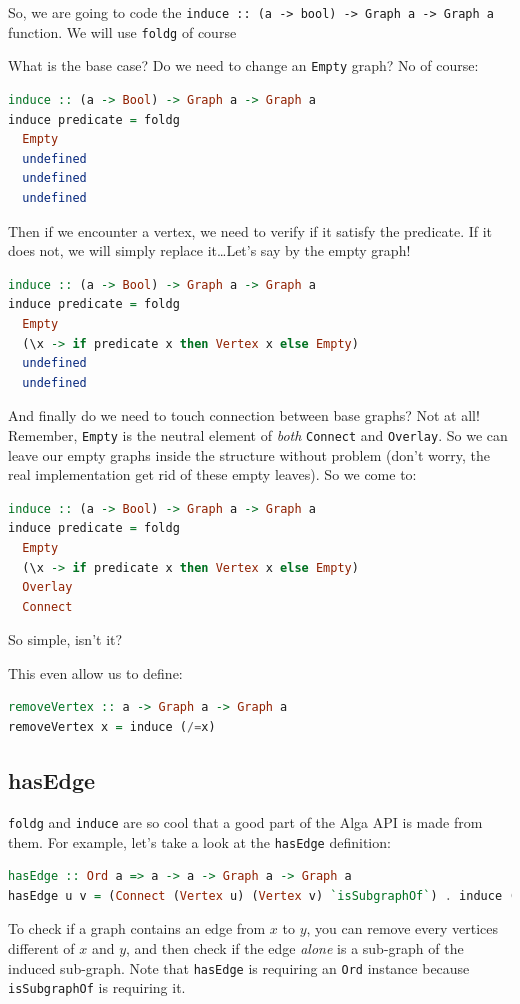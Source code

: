 \documentclass[10pt,a4paper]{article}
\begin{document}
So, we are going to code the \verb|induce :: (a -> bool) -> Graph a -> Graph a| function. We will use \verb|foldg| of course

What is the base case? Do we need to change an \verb|Empty| graph? No of course:

\begin{lstlisting}[language=Haskell, frame=single]
induce :: (a -> Bool) -> Graph a -> Graph a
induce predicate = foldg
  Empty 
  undefined
  undefined
  undefined
\end{lstlisting}

Then if we encounter a vertex, we need to verify if it satisfy the predicate. If it does not, we will simply replace it\ldots  Let's say by the empty graph!

\begin{lstlisting}[language=Haskell, frame=single]
induce :: (a -> Bool) -> Graph a -> Graph a
induce predicate = foldg 
  Empty
  (\x -> if predicate x then Vertex x else Empty)
  undefined
  undefined
\end{lstlisting}
 
And finally do we need to touch connection between base graphs? Not at all! Remember, \verb|Empty| is the neutral element of \emph{both} \verb|Connect| and \verb|Overlay|. So we can leave our empty graphs inside the structure without problem (don't worry, the real implementation get rid of these empty leaves). So we come to:

\begin{lstlisting}[language=Haskell, frame=single]
induce :: (a -> Bool) -> Graph a -> Graph a
induce predicate = foldg 
  Empty 
  (\x -> if predicate x then Vertex x else Empty)
  Overlay
  Connect
\end{lstlisting}

So simple, isn't it?
 
This even allow us to define:

\begin{lstlisting}[language=Haskell, frame=single]
removeVertex :: a -> Graph a -> Graph a
removeVertex x = induce (/=x)
\end{lstlisting}

\subsection{hasEdge}
\verb|foldg| and \verb|induce| are so cool that a good part of the Alga API is made from them. For example, let's take a look at the \verb|hasEdge| definition:
\begin{lstlisting}[language=Haskell, frame=single]
hasEdge :: Ord a => a -> a -> Graph a -> Graph a
hasEdge u v = (Connect (Vertex u) (Vertex v) `isSubgraphOf`) . induce (`elem` [u, v])
\end{lstlisting}
To check if a graph contains an edge from $x$ to $y$, you can remove every vertices different of $x$ and $y$, and then check if the edge \emph{alone} is a sub-graph of the induced sub-graph.
Note that \verb|hasEdge| is requiring an \verb|Ord| instance because \verb|isSubgraphOf| is requiring it.
\end{document}
